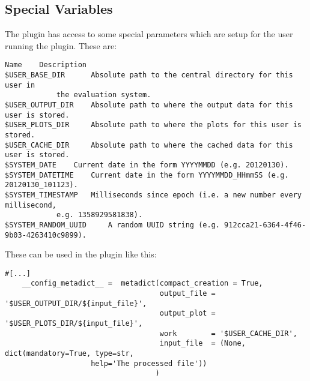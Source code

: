 \documentclass[a4paper,11pt]{ltxdoc}
\begin{document}
\subsection{Special Variables}
 The plugin has access to some special parameters which are setup for the user running the plugin. These are:
\begin{lstlisting}
Name 	Description
$USER_BASE_DIR 		Absolute path to the central directory for this user in 
			the evaluation system.
$USER_OUTPUT_DIR 	Absolute path to where the output data for this user is stored.
$USER_PLOTS_DIR 	Absolute path to where the plots for this user is stored.
$USER_CACHE_DIR 	Absolute path to where the cached data for this user is stored.
$SYSTEM_DATE 	Current date in the form YYYYMMDD (e.g. 20120130).
$SYSTEM_DATETIME 	Current date in the form YYYYMMDD_HHmmSS (e.g. 20120130_101123).
$SYSTEM_TIMESTAMP 	Milliseconds since epoch (i.e. a new number every millisecond, 
			e.g. 1358929581838).
$SYSTEM_RANDOM_UUID 	A random UUID string (e.g. 912cca21-6364-4f46-9b03-4263410c9899).
\end{lstlisting}
These can be used in the plugin like this:
\begin{lstlisting}
#[...]
    __config_metadict__ =  metadict(compact_creation = True,
                                    output_file = '$USER_OUTPUT_DIR/${input_file}',
                                    output_plot = '$USER_PLOTS_DIR/${input_file}',
                                    work        = '$USER_CACHE_DIR',
                                    input_file  = (None, dict(mandatory=True, type=str, 
				    help='The processed file'))
                                   )
\end{lstlisting}
\end{document}
